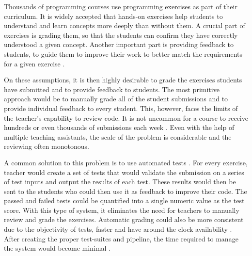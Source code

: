 Thousands of programming courses use programming exercises as part of their curriculum. It is widely accepted that hands-on exercises help students to understand and learn concepts more deeply than without them. A crucial part of exercises is grading them, so that the students can confirm they have correctly understood a given concept. Another important part is providing feedback to students, to guide them to improve their work to better match the requirements for a given exercise \cite{survey-feedback-gen, doing-feedback-well, towards-providing-feedback}.

On these assumptions, it is then highly desirable to grade the exercises students have submitted and to provide feedback to students. The most primitive approach would be to manually grade all of the student submissions and to provide individual feedback to every student. This, however, faces the limits of the teacher's capability to review code. It is not uncommon for a course to receive hundreds or even thousands of submissions each week \cite{overcode, codewebs, stanford-million, fox-clust-leverage-2015}. Even with the help of multiple teaching assistants, the scale of the problem is considerable and the reviewing often monotonous.

A common solution to this problem is to use automated tests \cite{tmc, automatic-tests, aalto-2010-auto-ass-systems-review, aalto-2001-auto-asses, alamutka-2005-auto-ass-survey}. For every exercise, teacher would create a set of tests that would validate the submission on a series of test inputs and output the results of each test. These results would then be sent to the students who could then use it as feedback to improve their code. The passed and failed tests could be quantified into a single numeric value as the test score. With this type of system, it eliminates the need for teachers to manually review and grade the exercises. Automatic grading could also be more consistent due to the objectivity of tests, faster and have around the clock availability \cite{ala-mutka-2003-caa-review, alamutka-2005-auto-ass-survey}. After creating the proper test-suites and pipeline, the time required to manage the system would become minimal \cite{auto-ass-tools-2017, alamutka-2005-auto-ass-survey}.

\iffalse
alamutka2005
Teachers often agree that it is not possible to assess automatically all the issues relating to good programming.

With larger assignments, a more common approach seems to be to combine manual and automatic assessment.
\fi

